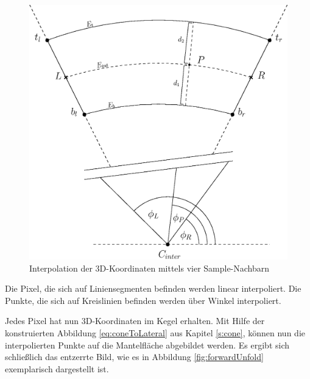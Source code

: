 \begin{figure}[!htb]
	\centering
	\includegraphics[scale=.6]{images/radialInterpolation.eps}
	\caption{Interpolation der 3D-Koordinaten mittels vier Sample-Nachbarn}
	\label{fig:radialInterpolation}
\end{figure}

Die Pixel, die sich auf Liniensegmenten befinden werden linear interpoliert. Die Punkte, die sich auf Kreislinien befinden werden über Winkel interpoliert.

Jedes Pixel hat nun 3D-Koordinaten im Kegel erhalten. Mit Hilfe der konstruierten Abbildung \ref{eq:coneToLateral} aus Kapitel \ref{s:cone}, können nun die interpolierten Punkte auf die Mantelfläche abgebildet werden. Es ergibt sich schließlich das entzerrte Bild, wie es in Abbildung \ref{fig:forwardUnfold} exemplarisch dargestellt ist.



